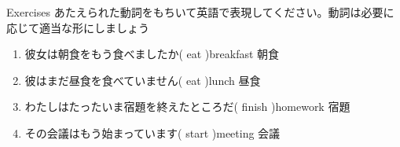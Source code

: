 \documentclass[aspectratio=169,xcolor={dvipsnames,table}]{beamer}
\newcommand{\myaudio}[1]{\href{#1}{\faVolumeUp}}
\begin{document}
\begin{frame}[plain]{Exercises}
 あたえられた動詞をもちいて英語で表現してください。動詞は必要に応じて適当な形にしましょう

\begin{enumerate}
 \item 彼女は朝食をもう食べましたか( eat )\hfill{\scriptsize breakfast  朝食}\\
 \item 彼はまだ昼食を食べていません( eat )\hfill{\scriptsize lunch  昼食}\\
 \item わたしはたったいま宿題を終えたところだ( finish )\hfill{\scriptsize homework  宿題}\\
 \item その会議はもう始まっています( start )\hfill{\scriptsize meeting  会議}\\
\end{enumerate}

\mbox{}\hfill{\scriptsize \myaudio{./audio/014_have_pp_kekka_06.mp3}}

\end{frame}
\end{document}
